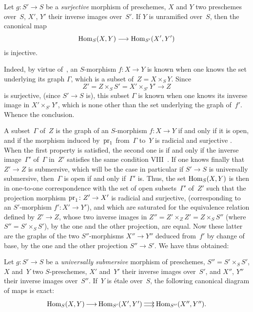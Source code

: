 \begin{proposition}
\label{IX.3.1}
Let $g\colon S'\to S$ be a \emph{surjective} morphism of
preschemes, $X$ and $Y$ two preschemes over~$S$, $X'$,
$Y'$ their inverse images over~$S'$. If $Y$ is unramified over~$S$, then the canonical map
$$
\Hom_S(X,Y) \to \Hom_{S'}(X',Y')
$$
is injective.
\end{proposition}

Indeed, by virtue of~, an $S$-morphism $f\colon X\to Y$
is known when one knows the set underlying its
graph $\Gamma$, which is a subset of~$Z=X\times_SY$. Since
$$
Z'=Z\times_SS'=X'\times_{S'}Y' \to Z
$$
is surjective, (since $S'\to S$ is), this subset $\Gamma$ is
known when one knows its inverse image in $X'\times_{S'}Y'$,
which is none other than the set underlying the graph of~$f'$. Whence
the conclusion.

A subset~$\Gamma$ of~$Z$ is the graph of an $S$-morphism $f\colon
X\to Y$ if and only if it is open, and if the morphism induced
by~$\mathrm{pr}_1$ from~$\Gamma$ to~$Y$ is radicial
and surjective \cf {}. When the first
property is satisfied, the second one is if and
only if the inverse image~$\Gamma'$ of~$\Gamma$ in~$Z'$ satisfies
the same condition VIII~. If one knows finally that
$Z'\to Z$ is submersive, which will be the case in particular if $S'\to
S$ is universally submersive, then~$\Gamma$ is open if and
only if~$\Gamma'$ is. Thus, the set $\operatorname{Hom}_S(X,Y)$ is
then in one-to-one correspondence with the set of open
subsets~$\Gamma'$ of~$Z'$ such that the projection morphism
$\pr_1\colon Z'\to X'$ is radicial and surjective, (\ie corresponding to an $S'$-morphism $f'\colon X'\to Y'$), and which
are saturated for the equivalence relation defined by
$Z'\to Z$, \ie whose two inverse images in $Z''=Z'\times_Z
Z'=Z\times_S S''$ (where $S''=S'\times_S S'$), by the one and the other
projection, are equal. Now these latter are the graphs
of the two $S''$-morphisms $X''\to Y''$ deduced from~$f'$ by
change of base, by the one and the other projection $S''\to S'$. We have
thus obtained:

\begin{proposition}
\label{IX.3.2}
Let $g\colon S'\to S$ be a \emph{universally submersive} morphism
of preschemes, $S''=S'\times_S S'$, $X$ and~$Y$ two
$S$-preschemes, $X'$ and~$Y'$ their inverse images over~$S'$,
and $X''$, $Y''$ their inverse images over~$S''$. If~$Y$ is \'etale
over~$S$, the following canonical diagram of maps is exact:
$$
\xymatrix@C=.5cm{ {\Hom_S(X,Y)} \ar[r] & {\Hom_{S'}(X',Y')}
\ar@<2pt>[r]\ar@<-2pt>[r] & {\Hom_{S''}(X'',Y'')}. }
$$
\end{proposition}

